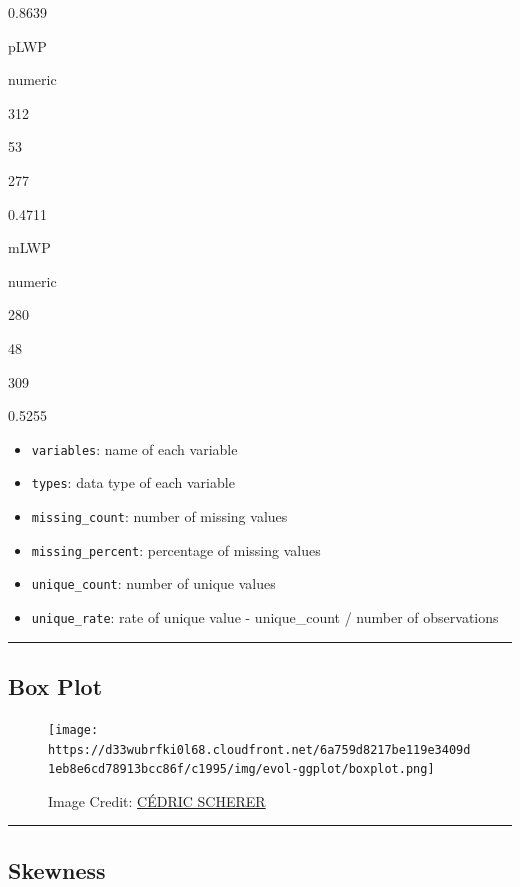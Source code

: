 \documentclass[
  letterpaper,
  DIV=11,
  numbers=noendperiod]{scrreprt}
\providecommand{\tightlist}{%
  \setlength{\itemsep}{0pt}\setlength{\parskip}{0pt}}\usepackage{longtable,booktabs,array}
\begin{document}
0.8639

pLWP

numeric

312

53

277

0.4711

mLWP

numeric

280

48

309

0.5255

\begin{itemize}
\tightlist
\item
  \texttt{variables}: name of each variable
\item
  \texttt{types}: data type of each variable
\item
  \texttt{missing\_count}: number of missing values
\item
  \texttt{missing\_percent}: percentage of missing values
\item
  \texttt{unique\_count}: number of unique values
\item
  \texttt{unique\_rate}: rate of unique value - unique\_count / number
  of observations
\end{itemize}

\begin{center}\rule{0.5\linewidth}{0.5pt}\end{center}

\hypertarget{box-plot}{%
\subsection{Box Plot}\label{box-plot}}

\begin{figure}

{\centering \texttt{[image: https://d33wubrfki0l68.cloudfront.net/6a759d8217be119e3409d1eb8e6cd78913bcc86f/c1995/img/evol-ggplot/boxplot.png]}

}

\caption{Image Credit:
\href{https://www.cedricscherer.com/2019/05/17/the-evolution-of-a-ggplot-ep.-1/}{CÉDRIC
SCHERER}}

\end{figure}

\begin{center}\rule{0.5\linewidth}{0.5pt}\end{center}

\hypertarget{skewness}{%
\subsection{Skewness}\label{skewness}}
\end{document}
